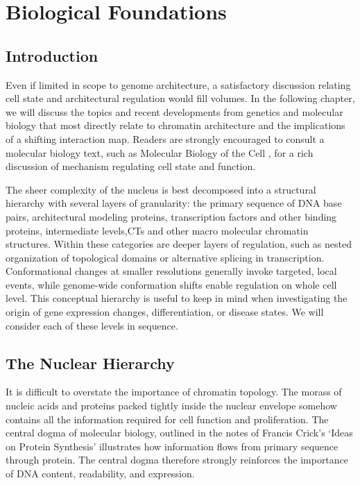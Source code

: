 
\chapter{Biological Foundations}

\section*{Introduction}

Even if limited in scope to genome architecture, a satisfactory discussion relating cell state and architectural regulation would fill
volumes.  In the following chapter, we will discuss the topics and recent developments from genetics and molecular biology that most
directly relate to chromatin architecture and the implications of a shifting interaction map.  Readers are strongly encouraged
to consult a molecular biology text, such as Molecular Biology of the Cell \citep{alberts2002}, for a rich discussion of mechanism
regulating cell state and function.

The sheer complexity of the nucleus is best decomposed into a structural hierarchy with several layers of granularity: the primary
sequence of \gls{DNA} base pairs, architectural modeling proteins, transcription factors and other binding proteins, intermediate levels,\glspl{CT}
and other macro molecular chromatin structures.  Within these categories are deeper layers of regulation, such as nested
organization of topological domains or alternative splicing in transcription.  Conformational changes at smaller resolutions generally
invoke targeted, local events, while genome-wide conformation shifts enable regulation on whole cell level.  This conceptual hierarchy
is useful to keep in mind when investigating the origin of gene expression changes, differentiation, or disease states.  We will
consider each of these levels in sequence.

\section*{The Nuclear Hierarchy}

It is difficult to overstate the importance of chromatin topology.  The morass of nucleic acids and proteins packed tightly inside the
nuclear envelope somehow contains all the information required for cell function and proliferation.  The central dogma of molecular biology,
outlined in the notes of Francis Crick's `Ideas on Protein Synthesis' \citep{crick1970} illustrates how information flows from primary
sequence through protein.  The central dogma therefore strongly reinforces the importance of \gls{DNA} content, readability, and expression.

